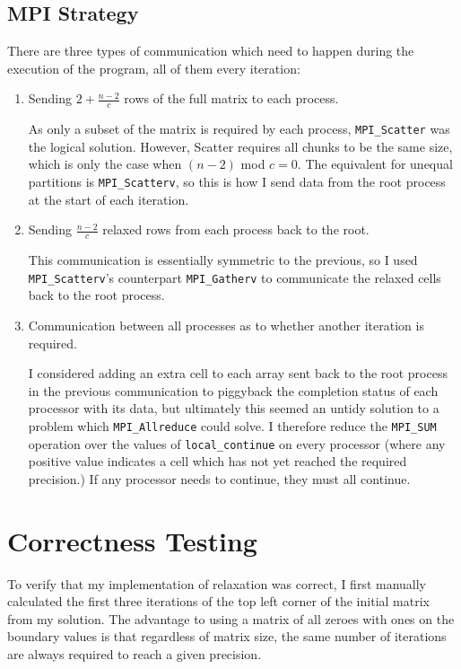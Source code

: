 \documentclass[12pt]{article}
\begin{document}
\subsection{MPI Strategy}

There are three types of communication which need to happen during the execution of the program, all of them every iteration:
\begin{enumerate}
	\item Sending $2+\frac{n-2}{c}$ rows of the full matrix to each process.\par
			As only a subset of the matrix is required by each process, \texttt{MPI\_Scatter} was the logical solution. However, Scatter requires all chunks to be the same size, which is only the case when $(n-2)$ mod $c=0$. The equivalent for unequal partitions is \texttt{MPI\_Scatterv}, so this is how I send data from the root process at the start of each iteration.
	
	\item Sending $\frac{n-2}{c}$ relaxed rows from each process back to the root. \par
			This communication is essentially symmetric to the previous, so I used \texttt{MPI\_Scatterv}'s counterpart \texttt{MPI\_Gatherv} to communicate the relaxed cells back to the root process.
			
	\item Communication between all processes as to whether another iteration is required.\par
			I considered adding an extra cell to each array sent back to the root process in the previous communication to piggyback the completion status of each processor with its data, but ultimately this seemed an untidy solution to a problem which \texttt{MPI\_Allreduce} could solve. I therefore reduce the \texttt{MPI\_SUM} operation over the values of \texttt{local\_continue} on every processor (where any positive value indicates a cell which has not yet reached the required precision.) If any processor needs to continue, they must all continue.
\end{enumerate}


\section{Correctness Testing}

To verify that my implementation of relaxation was correct, I first manually calculated the first three iterations of the top left corner of the initial matrix from my solution. The advantage to using a matrix of all zeroes with ones on the boundary values is that regardless of matrix size, the same number of iterations are always required to reach a given precision. 
\end{document}

